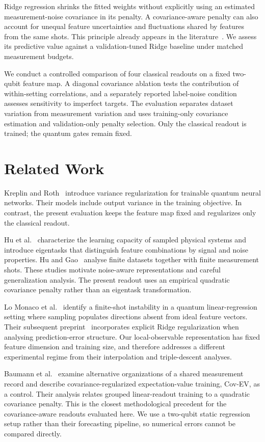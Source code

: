 \documentclass[conference]{IEEEtran}
\begin{document}
Ridge regression shrinks the fitted weights without explicitly using an estimated measurement-noise covariance in its penalty. A covariance-aware penalty can also account for unequal feature uncertainties and fluctuations shared by features from the same shots. This principle already appears in the literature~\cite{baumann}. We assess its predictive value against a validation-tuned Ridge baseline under matched measurement budgets.

We conduct a controlled comparison of four classical readouts on a fixed two-qubit feature map. A diagonal covariance ablation tests the contribution of within-setting correlations, and a separately reported label-noise condition assesses sensitivity to imperfect targets. The evaluation separates dataset variation from measurement variation and uses training-only covariance estimation and validation-only penalty selection. Only the classical readout is trained; the quantum gates remain fixed.

\section{Related Work}
Kreplin and Roth~\cite{kreplin} introduce variance regularization for trainable quantum neural networks. Their models include output variance in the training objective. In contrast, the present evaluation keeps the feature map fixed and regularizes only the classical readout.

Hu et al.~\cite{hu2023} characterize the learning capacity of sampled physical systems and introduce eigentasks that distinguish feature combinations by signal and noise properties. Hu and Gao~\cite{hu2024} analyse finite datasets together with finite measurement shots. These studies motivate noise-aware representations and careful generalization analysis. The present readout uses an empirical quadratic covariance penalty rather than an eigentask transformation.

Lo Monaco et al.~\cite{shots} identify a finite-shot instability in a quantum linear-regression setting where sampling populates directions absent from ideal feature vectors. Their subsequent preprint~\cite{triple} incorporates explicit Ridge regularization when analysing prediction-error structure. Our local-observable representation has fixed feature dimension and training size, and therefore addresses a different experimental regime from their interpolation and triple-descent analyses.

Baumann et al.~\cite{baumann} examine alternative organizations of a shared measurement record and describe covariance-regularized expectation-value training, Cov-EV, as a control. Their analysis relates grouped linear-readout training to a quadratic covariance penalty. This is the closest methodological precedent for the covariance-aware readouts evaluated here. We use a two-qubit static regression setup rather than their forecasting pipeline, so numerical errors cannot be compared directly.
\end{document}

